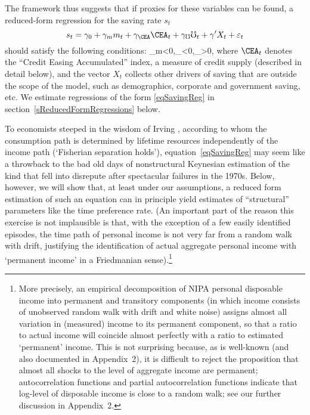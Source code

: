 \documentclass[titlepage]{\econtex}
\begin{document}
The framework thus suggests that if proxies for these variables can be
found, a reduced-form regression for the saving rate $s_t$
\begin{equation}
s_t = \gamma_0+\gamma_m m_t+
\gamma_{\CEA} \CEA_t+ \gamma_\mho \mho_t + \gamma' X_t +
\varepsilon_t \label{eqSavingReg}
\end{equation}
should satisfy the following conditions:
\be \gamma_m<0,\qquad \gamma_{\CEA}<0,\qquad \gamma_\mho>0, \ee where $\CEA_t$ denotes the ``Credit Easing
Accumulated'' index, a measure of credit supply (described in detail below), and the vector $X_t$
collects other drivers of saving that are outside the scope of the
model, such as demographics, corporate and government saving, etc.  We estimate regressions of the form
\eqref{eqSavingReg} in section~\ref{sReducedFormRegressions} below.

To economists steeped in the wisdom of Irving \cite{fisher:interestTheory}, according to whom the consumption path is determined by lifetime resources independently of the income path (`Fisherian separation holds'), equation~\eqref{eqSavingReg} may seem like a throwback to the bad old days of nonstructural Keynesian estimation of the kind that fell into disrepute after spectacular failures in the 1970s.  Below, however, we will show that, at least under our assumptions, a reduced form estimation of such an equation can in principle yield estimates of ``structural'' parameters like the time preference rate.  (An important part of the reason this exercise is not implausible is that, with the exception of a few easily identified episodes, the time path of personal income is not very far from a random walk with drift, justifying the identification of actual aggregate personal income with `permanent income' in a Friedmanian sense).\footnote{More precisely, an empirical decomposition of NIPA personal disposable income into permanent and transitory components (in which income consists of unobserved random walk with drift and white noise) assigns almost all variation in (measured) income to its permanent component, so that a ratio to actual income will coincide almost perfectly with a ratio to estimated `permanent' income. This is not surprising because, as is well-known (and also documented in Appendix~2), it is difficult to reject the proposition that almost all shocks to the level of aggregate income are permanent; autocorrelation functions and partial autocorrelation functions indicate that log-level of disposable income is close to a random walk; see our further discussion in Appendix~2.}
\end{document}
